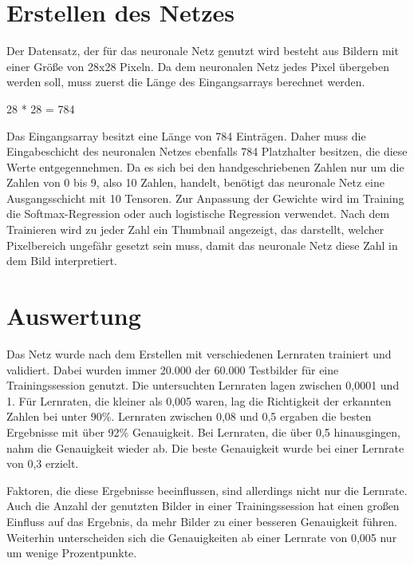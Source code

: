 \section{Erstellen des Netzes}
\label{sec:erstellenDesNetzes}
\printsubchapterauthor{\authorNiklas}
Der Datensatz, der für das neuronale Netz genutzt wird besteht aus Bildern mit einer Größe von 28x28 Pixeln. Da dem neuronalen Netz jedes Pixel übergeben werden soll, muss zuerst die Länge des Eingangsarrays berechnet werden.
\begin{center} 28 * 28 = 784\end{center}
Das Eingangsarray besitzt eine Länge von 784 Einträgen. Daher muss die Eingabeschicht des neuronalen Netzes ebenfalls 784 Platzhalter besitzen, die diese Werte entgegennehmen. Da es sich bei den handgeschriebenen Zahlen nur um die Zahlen von 0 bis 9, also 10 Zahlen, handelt, benötigt das neuronale Netz eine Ausgangsschicht mit 10 Tensoren. Zur Anpassung der Gewichte wird im Training die Softmax-Regression oder auch logistische Regression verwendet. Nach dem Trainieren wird zu jeder Zahl ein Thumbnail angezeigt, das darstellt, welcher Pixelbereich ungefähr gesetzt sein muss, damit das neuronale Netz diese Zahl in dem Bild interpretiert.

\section{Auswertung}
\label{sec:auswertung}
\printsubchapterauthor{\authorMarco}
Das Netz wurde nach dem Erstellen mit verschiedenen Lernraten trainiert und validiert. Dabei wurden immer 20.000 der 60.000 Testbilder für eine Trainingssession genutzt. Die untersuchten Lernraten lagen zwischen 0,0001 und 1. Für Lernraten, die kleiner als 0,005 waren, lag die Richtigkeit der erkannten Zahlen bei unter 90\%. Lernraten zwischen 0,08 und 0,5 ergaben die besten Ergebnisse mit über 92\% Genauigkeit. Bei Lernraten, die über 0,5 hinausgingen, nahm die Genauigkeit wieder ab. Die beste Genauigkeit wurde bei einer Lernrate von 0,3 erzielt.

Faktoren, die diese Ergebnisse beeinflussen, sind allerdings nicht nur die Lernrate. Auch die Anzahl der genutzten Bilder in einer Trainingssession hat einen großen Einfluss auf das Ergebnis, da mehr Bilder zu einer besseren Genauigkeit führen. Weiterhin unterscheiden sich die Genauigkeiten ab einer Lernrate von 0,005 nur um wenige Prozentpunkte.

